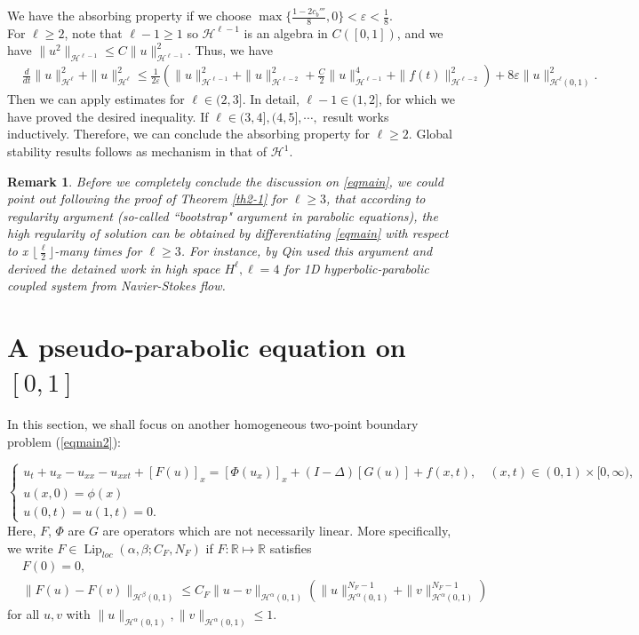 \documentclass[10pt,a4paper,final]{article}
\numberwithin{equation}{section}
\newtheorem{remark}[theorem]{Remark}
\newcommand{\R}{\mathbb{R}}
\newcommand{\cH}{\mathcal{H}}
\newcommand{\Ga}{\alpha}
\newcommand{\Gb}{\beta}
\newcommand{\Ge}{\varepsilon}
\DeclareMathOperator*{\Lip}{Lip}
\begin{document}
We have the absorbing property if we choose $\max\{\frac{1-2c_{b}'''}{8},0\}<\Ge<\frac{1}{8}$.\\

For $\ell\geq 2$, note that $\ell-1\geq 1$ so $\cH^{\ell-1}$ is an algebra in $C([0, 1])$, and we have $\|u^2\|_{\cH^{\ell-1}}\leq 
C\|u\|_{\cH^{\ell-1}}^2$. Thus, we have 
\begin{align*}
&\frac{d}{dt}\|u\|_{\cH^{\ell}}^2+\|u\|_{\cH^\ell}^2\leq \frac{1}{2\Ge}(\|u\|_{\cH^{\ell-1}}^2+\|u\|_{\cH^{\ell-2}}^2+\frac{C}{2}\|u\|_{\cH^{\ell-1}}^4+\|f(t)\|^2_{\cH^{\ell-2}})+8\Ge\|u\|_{\cH^\ell(0,1)}^2.
\end{align*}
Then we can apply estimates for $\ell\in(2, 3]$. In detail, $\ell-1\in (1,2]$, for which we have proved the desired inequality. If $\ell\in (3, 4], (4, 5], \cdots,$ result works inductively. Therefore, we can conclude the absorbing property for $\ell\geq 2.$ Global stability results follows as mechanism in that of $\cH^1$. 

\begin{remark}
    Before we completely conclude the discussion on \eqref{eqmain}, we could point out following the proof of Theorem \ref{th2-1} for $\ell\ge 3$, that according to regularity argument (so-called ``bootstrap" argument in parabolic equations), the high regularity of solution can be obtained by differentiating \eqref{eqmain} with respect to x $\lfloor \frac{\ell}{2}\rfloor$-many times for $\ell\geq 3$. For instance, \cite{Qin} by Qin used this argument and derived the detained work in high space $H^\ell, \ell = 4$ for 1D hyperbolic-parabolic coupled system from Navier-Stokes flow. 
\end{remark}
\section{A pseudo-parabolic equation on $[0,1]$}

In this section, we shall focus on another homogeneous two-point boundary problem (\ref{eqmain2}):

\begin{equation}\label{whole}
\begin{cases}
    u_t+u_x-u_{xx}-u_{xxt}+[F(u)]_x=[\Phi(u_x)]_x+(I-\Delta)[G(u)]+f(x,t),  \quad (x, t)\in (0,1)\times [0, \infty),&\\
    u(x,0)=\phi(x) &\\
    u(0,t)=u(1,t)=0.&
    \end{cases}
\end{equation}
Here, $F$, $\Phi$ are $G$ are operators which are not necessarily linear. 
More specifically, we write $F\in \Lip_{loc}(\Ga,\Gb;C_F,N_F)$ if $F:\R\mapsto\R$ satisfies
\begin{align*}
&F(0)=0,\\
    &\|F(u)-F(v)\|_{\cH^{\Gb}(0,1)}\leq C_F\|u-v\|_{\cH^{\Ga}(0,1)}(\|u\|_{\cH^{\Ga}(0,1)}^{N_F-1}+\|v\|_{\cH^{\Ga}(0,1)}^{N_F-1})
\end{align*}
for all $u,v$ with $\|u\|_{\cH^{\Ga}(0,1)}, \|v\|_{\cH^{\Ga}(0,1)}\leq 1$. \\
\end{document}
